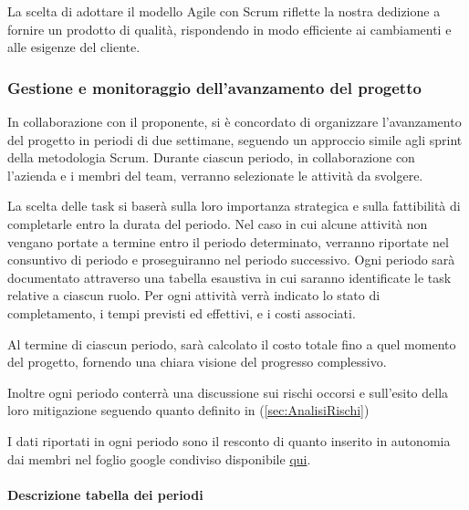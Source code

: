 La scelta di adottare il modello Agile con Scrum riflette la nostra dedizione a fornire un prodotto di qualità, rispondendo in modo efficiente ai cambiamenti e alle esigenze del cliente.

\subsubsection{Gestione e monitoraggio dell'avanzamento del progetto}
In collaborazione con il proponente, si è concordato di organizzare l'avanzamento del progetto in periodi di due settimane, seguendo un approccio simile agli sprint della metodologia Scrum. Durante ciascun periodo, in collaborazione con l'azienda e i membri del team, verranno selezionate le attività da svolgere.

La scelta delle task si baserà sulla loro importanza strategica e sulla fattibilità di completarle entro la durata del periodo. Nel caso in cui alcune attività non vengano portate a termine entro il periodo determinato, verranno riportate nel consuntivo di periodo e proseguiranno nel periodo successivo.
Ogni periodo sarà documentato attraverso una tabella esaustiva in cui saranno identificate le task relative a ciascun ruolo. Per ogni attività verrà indicato lo stato di completamento, i tempi previsti ed effettivi, e i costi associati.



Al termine di ciascun periodo, sarà calcolato il costo totale fino a quel momento del progetto, fornendo una chiara visione del progresso complessivo.

Inoltre ogni periodo conterrà una discussione sui rischi occorsi e sull'esito della loro mitigazione seguendo quanto definito in (\ref{sec:AnalisiRischi})

I dati riportati in ogni periodo sono il resconto di quanto inserito in autonomia dai membri nel foglio google condiviso disponibile
\href{https://docs.google.com/spreadsheets/d/1gbGCTKO6tLKN7lI9kTZHLpoItniJIi9X/edit?usp=sharing&ouid=104272518979154193028&rtpof=true&sd=true}{qui}.

\paragraph{Descrizione tabella dei periodi}\label{sec:DescrTabella}\hspace{1pt}

